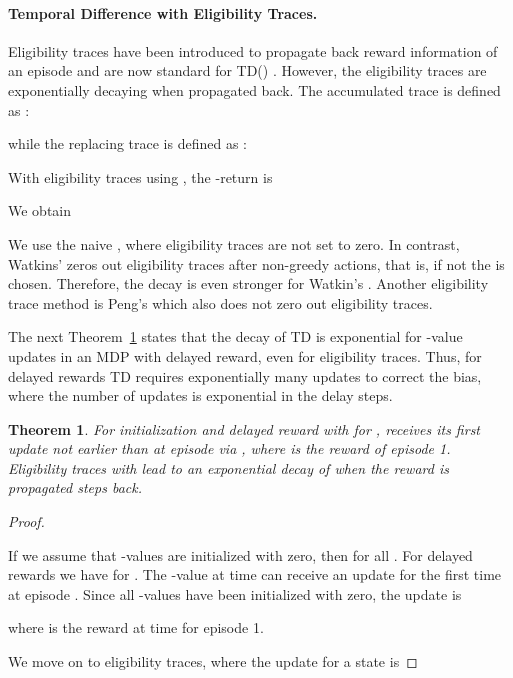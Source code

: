 \documentclass{article}
\newtheorem{theoremA}{Theorem}
\begin{document}
\begin{appendices}
\paragraph{Temporal Difference with Eligibility Traces.}
Eligibility traces have been introduced to propagate
back reward information of an episode and are now standard for
TD() \cite{Singh:96}.
However, the eligibility traces are exponentially decaying when
propagated back.
The accumulated trace is defined as \cite{Singh:96}:
 
while the replacing trace is defined as \cite{Singh:96}:
 

With eligibility traces using , the -return  is \cite{Sutton:18book}
 
We obtain
 




We use the naive , where eligibility traces are not set to
zero.
In contrast, Watkins'  \cite{Watkins:89}
zeros out eligibility traces
after non-greedy actions, that is, if not the  is chosen.
Therefore, the decay is even stronger for  Watkin's .
Another eligibility trace method is Peng's  \cite{Peng:96}
which also does not zero out eligibility traces.


The next Theorem~\ref{th:AexponDecay} 
states that the decay of TD is exponential for
-value updates in an MDP with delayed reward, even for eligibility traces.
Thus, for delayed rewards TD requires exponentially many updates to correct the bias, 
where the number of updates is exponential in the delay steps.  
\begin{theoremA}
\label{th:AexponDecay}
For initialization   and
delayed reward with  for , 
 receives its 
first update not earlier than at episode  via
,
where  is the reward of episode 1.
Eligibility traces with  
lead to an exponential decay of  when the reward
is propagated  steps back.
\end{theoremA}


\begin{proof}
\label{proof:ATD}

If we assume that -values are initialized with zero, then
 for all .
For delayed rewards we have  for .
The -value   at time  can receive an
update for the first time at episode . Since all -values have
been initialized with zero, the update is
 
where  is the reward at time  for episode 1.

We move on to eligibility traces, where the
update for a state  is
 


\end{proof}
\end{appendices}
\end{document}
